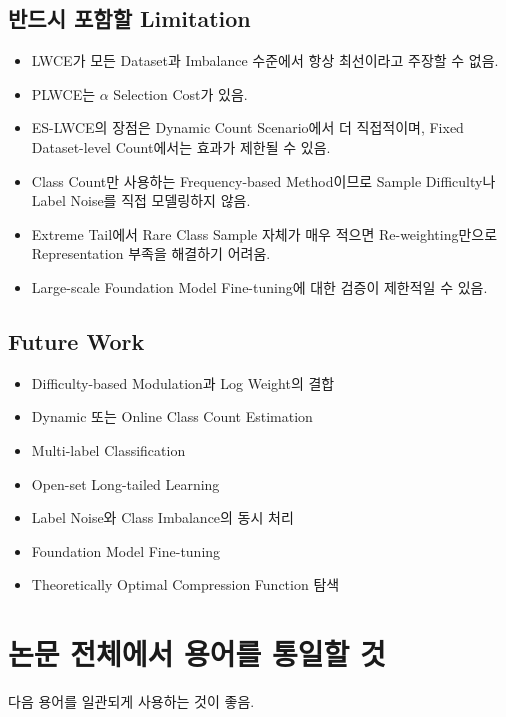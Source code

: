 \documentclass[11pt,a4paper]{article}
\begin{document}
\subsection{반드시 포함할 Limitation}

\begin{itemize}
\item LWCE가 모든 Dataset과 Imbalance 수준에서 항상 최선이라고 주장할 수 없음.
\item PLWCE는 \(\alpha\) Selection Cost가 있음.
\item ES-LWCE의 장점은 Dynamic Count Scenario에서 더 직접적이며, Fixed Dataset-level Count에서는 효과가 제한될 수 있음.
\item Class Count만 사용하는 Frequency-based Method이므로 Sample Difficulty나 Label Noise를 직접 모델링하지 않음.
\item Extreme Tail에서 Rare Class Sample 자체가 매우 적으면 Re-weighting만으로 Representation 부족을 해결하기 어려움.
\item Large-scale Foundation Model Fine-tuning에 대한 검증이 제한적일 수 있음.
\end{itemize}

\subsection{Future Work}

\begin{itemize}
\item Difficulty-based Modulation과 Log Weight의 결합
\item Dynamic 또는 Online Class Count Estimation
\item Multi-label Classification
\item Open-set Long-tailed Learning
\item Label Noise와 Class Imbalance의 동시 처리
\item Foundation Model Fine-tuning
\item Theoretically Optimal Compression Function 탐색
\end{itemize}

\section{논문 전체에서 용어를 통일할 것}

다음 용어를 일관되게 사용하는 것이 좋음.
\end{document}
